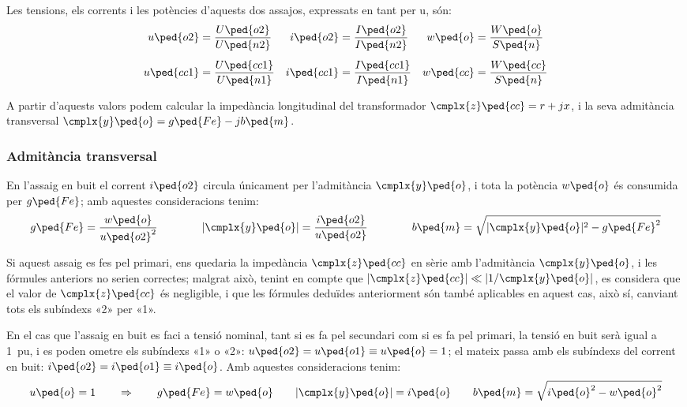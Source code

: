 Les tensions, els corrents i les potències d'aquests dos  assajos,
expressats en tant per u, són:
\begin{align}
    u\ped{o2} &=\frac{U\ped{o2}}{U\ped{n2}} &
    i\ped{o2} &=\frac{I\ped{o2}}{I\ped{n2}} &
    w\ped{o}  &=\frac{W\ped{o}}{S\ped{n}} \\[1ex]
    u\ped{cc1} &=\frac{U\ped{cc1}}{U\ped{n1}} &
    i\ped{cc1} &=\frac{I\ped{cc1}}{I\ped{n1}} &
    w\ped{cc} &=\frac{W\ped{cc}}{S\ped{n}}
\end{align}

A partir d'aquests valors podem calcular la impedància longitudinal
del transformador $\cmplx{z}\ped{cc}=r+j x$, i la seva admitància
transversal $\cmplx{y}\ped{o}=g\ped{Fe}-j b\ped{m}$.

\subsubsection{Admitància transversal}

En l'assaig en buit el corrent $i\ped{o2}$ circula
únicament per l'admitància $\cmplx{y}\ped{o}$, i tota la potència
$w\ped{o}$ és consumida per $g\ped{Fe}$; amb aquestes consideracions
tenim:
\begin{equation}
    g\ped{Fe} = \frac{w\ped{o}}{u\ped{o2}^2} \qquad\qquad
    |\cmplx{y}\ped{o}| = \frac{i\ped{o2}}{u\ped{o2}}
    \qquad\qquad
    b\ped{m} = \sqrt{|\cmplx{y}\ped{o}|^2 - g\ped{Fe}^2}
\end{equation}

Si aquest assaig es fes pel primari, ens quedaria la impedància
$\cmplx{z}\ped{cc}$ en sèrie amb l'admitància $\cmplx{y}\ped{o}$, i les fórmules anteriors no serien correctes; malgrat això,
tenint en compte que $|\cmplx{z}\ped{cc}| \ll |1/\cmplx{y}\ped{o}|$,
es  considera que el valor de $\cmplx{z}\ped{cc}$ és negligible, i
que les fórmules deduïdes anteriorment són també aplicables en
aquest cas, això sí, canviant tots els subíndexs «2» per «1».

En el cas que l'assaig en buit es faci a tensió nominal, tant  si es
fa pel secundari com si es fa pel primari, la tensió en buit serà
igual a \qty{1}{pu}, i es poden ometre els subíndexs «1» o «2»:
$u\ped{o2} = u\ped{o1} \equiv u\ped{o} = 1$; el mateix passa amb els
subíndexs del corrent en buit: $i\ped{o2} = i\ped{o1} \equiv
i\ped{o}$. Amb aquestes consideracions tenim:
\begin{equation}
    u\ped{o} = 1 \qquad \Rightarrow \qquad g\ped{Fe} = w\ped{o} \qquad
    |\cmplx{y}\ped{o}| = i\ped{o} \qquad
    b\ped{m} = \sqrt{i\ped{o}^2 - w\ped{o}^2}
    \label{eq:assaig-buit-nomianl}
\end{equation}

